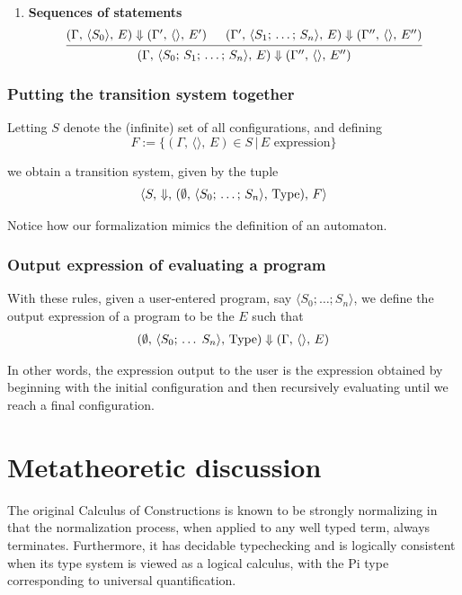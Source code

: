 \documentclass{article}
\begin{document}
\begin{enumerate}
\item \textbf{Sequences of statements} \\
  \[
    \begin{prooftree}
      \hypo{(\Gamma, \, \langle S_0 \rangle, \, E) \Downarrow
        (\Gamma', \, \langle \rangle, \, E') }
      \hypo{(\Gamma', \, \langle S_1; \, \dots; \, S_n \rangle, \, E) \Downarrow
        (\Gamma'', \, \langle \rangle, \, E'') }
      \infer2{(\Gamma, \, \langle S_0; \, S_1; \, \dots; \, S_n \rangle, \, E) \Downarrow
        (\Gamma'', \, \langle \rangle, \, E'') }
    \end{prooftree}
  \]

\end{enumerate}

\subsubsection{Putting the transition system together}
Letting $S$ denote the (infinite) set of all configurations, and defining
\[ F := \{ (\Gamma, \, \langle \rangle, \, E) \in S \, | \, E \text{ expression} \} \]

we obtain a transition system, given by the tuple
\begin{align*}
  \langle S, \, \Downarrow, \, 
  (\emptyset, \, \langle S_0; \, \dots; \, S_n \rangle, \, \operatorname{Type}), \, F \rangle
\end{align*}

Notice how our formalization mimics the definition of an automaton.

\subsubsection{Output expression of evaluating a program}
With these rules, given a user-entered program, say $\langle S_0;
\dots; S_n \rangle$, we define the
output expression of a program to be the $E$ such that
\begin{align*}
  (\emptyset, \, \langle S_0; \, \dots \; S_n \rangle, \, \operatorname{Type}) \Downarrow
  (\Gamma, \, \langle \rangle, \, E)
\end{align*}

In other words, the expression output to the user is the expression obtained by
beginning with the initial configuration and then recursively evaluating
until we reach a final configuration.

\section{Metatheoretic discussion}
The original Calculus of Constructions is known to be strongly normalizing in
that the normalization process, when applied to any well typed term, always
terminates. Furthermore, it has decidable typechecking and is logically
consistent when its type system is viewed as a logical calculus, with the Pi type
corresponding to universal quantification.
\end{document}
